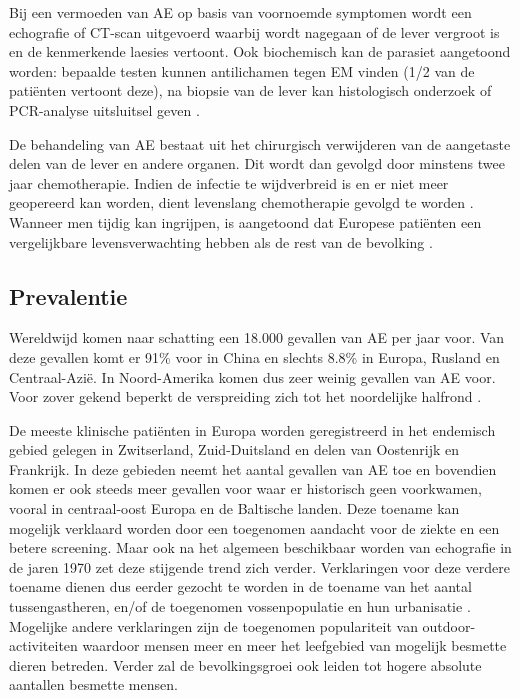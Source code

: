 \documentclass[twoside]{extreport}
\begin{document}
Bij een vermoeden van AE op basis van voornoemde symptomen wordt een
echografie of CT-scan uitgevoerd waarbij wordt nagegaan of de lever
vergroot is en de kenmerkende laesies vertoont. Ook biochemisch kan de
parasiet aangetoond worden: bepaalde testen kunnen antilichamen tegen EM
vinden (1/2 van de patiënten vertoont deze), na biopsie van de lever kan
histologisch onderzoek of PCR-analyse uitsluitsel geven
\citep{eckert2001oie}.

De behandeling van AE bestaat uit het chirurgisch verwijderen van de
aangetaste delen van de lever en andere organen. Dit wordt dan gevolgd
door minstens twee jaar chemotherapie. Indien de infectie te
wijdverbreid is en er niet meer geopereerd kan worden, dient levenslang
chemotherapie gevolgd te worden \citep{eckert2001oie}. Wanneer men
tijdig kan ingrijpen, is aangetoond dat Europese patiënten een
vergelijkbare levensverwachting hebben als de rest van de bevolking
\citep{torgerson2008alveolar, piarroux2011clinical}.

\subsection{Prevalentie}\label{prevalentie}

Wereldwijd komen naar schatting een 18.000 gevallen van AE per jaar
voor. Van deze gevallen komt er 91\% voor in China en slechts 8.8\% in
Europa, Rusland en Centraal-Azië. In Noord-Amerika komen dus zeer weinig
gevallen van AE voor. Voor zover gekend beperkt de verspreiding zich tot
het noordelijke halfrond \citep{torgerson2010global}.

De meeste klinische patiënten in Europa worden geregistreerd in het
endemisch gebied gelegen in Zwitserland, Zuid-Duitsland en delen van
Oostenrijk en Frankrijk. In deze gebieden neemt het aantal gevallen van
AE toe en bovendien komen er ook steeds meer gevallen voor waar er
historisch geen voorkwamen, vooral in centraal-oost Europa en de
Baltische landen. Deze toename kan mogelijk verklaard worden door een
toegenomen aandacht voor de ziekte en een betere screening. Maar ook na
het algemeen beschikbaar worden van echografie in de jaren 1970 zet deze
stijgende trend zich verder. Verklaringen voor deze verdere toename
dienen dus eerder gezocht te worden in de toename van het aantal
tussengastheren, en/of de toegenomen vossenpopulatie en hun urbanisatie
\citep{vuitton2015clinical}. Mogelijke andere verklaringen zijn de
toegenomen populariteit van outdoor-activiteiten waardoor mensen meer en
meer het leefgebied van mogelijk besmette dieren betreden. Verder zal de
bevolkingsgroei ook leiden tot hogere absolute aantallen besmette
mensen.
\end{document}
